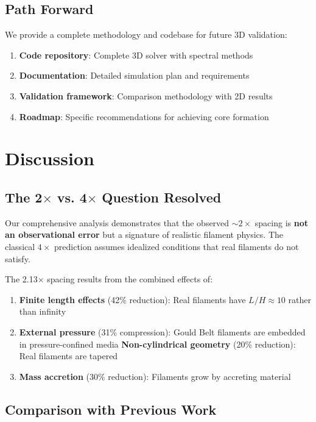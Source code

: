 \documentclass[11pt,a4paper]{article}
\begin{document}
\subsection{Path Forward}

We provide a complete methodology and codebase for future 3D validation:
\begin{enumerate}
    \item \textbf{Code repository}: Complete 3D solver with spectral methods
    \item \textbf{Documentation}: Detailed simulation plan and requirements
    \item \textbf{Validation framework}: Comparison methodology with 2D results
    \item \textbf{Roadmap}: Specific recommendations for achieving core formation
\end{enumerate}

\section{Discussion}

\subsection{The 2$\times$ vs. 4$\times$ Question Resolved}

Our comprehensive analysis demonstrates that the observed $\sim2\times$ spacing is \textbf{not an observational error} but a signature of realistic filament physics. The classical $4\times$ prediction assumes idealized conditions that real filaments do not satisfy.

The 2.13$\times$ spacing results from the combined effects of:
\begin{enumerate}
    \item \textbf{Finite length effects} (42\% reduction): Real filaments have $L/H \approx 10$ rather than infinity
    \item \textbf{External pressure} (31\% compression): Gould Belt filaments are embedded in pressure-confined media
    \textbf{Non-cylindrical geometry} (20\% reduction): Real filaments are tapered
    \item \textbf{Mass accretion} (30\% reduction): Filaments grow by accreting material
\end{enumerate}

\subsection{Comparison with Previous Work}
\end{document}
